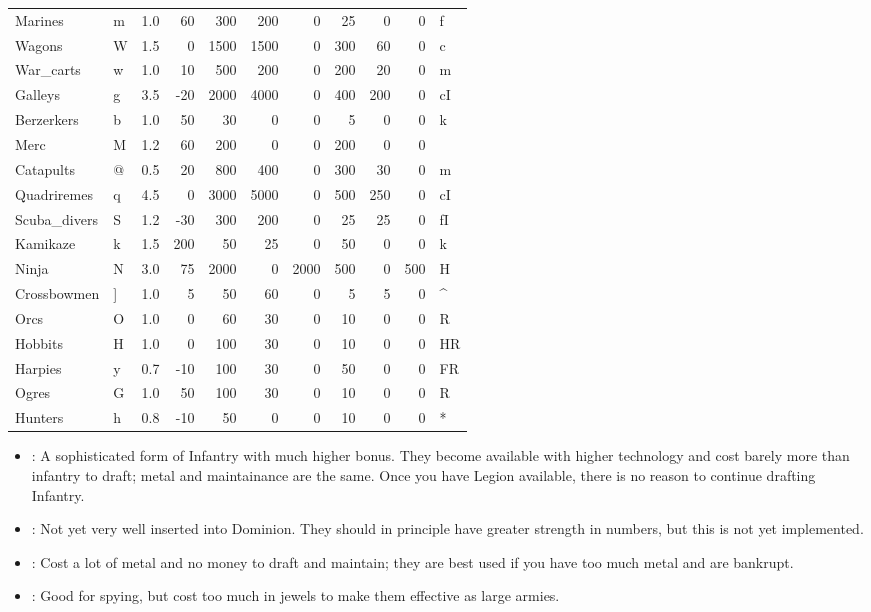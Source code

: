 \begin{same}
\begin{table}[hbpt]
\begin{tabular}{ || l | l | r | r | r | r | r | r | r | r | l || }
Marines      &m& 1.0&  60 & 300 & 200 &   0 &  25 &   0 &   0 &f\\
Wagons       &W& 1.5&   0 &1500 &1500 &   0 & 300 &  60 &   0 &c\\
War_carts    &w& 1.0&  10 & 500 & 200 &   0 & 200 &  20 &   0 &m\\
Galleys      &g& 3.5& -20 &2000 &4000 &   0 & 400 & 200 &   0 &cI\\
Berzerkers   &b& 1.0&  50 &  30 &   0 &   0 &   5 &   0 &   0 &k\\
Merc         &M& 1.2&  60 & 200 &   0 &   0 & 200 &   0 &   0 &\\
Catapults    &@& 0.5&  20 & 800 & 400 &   0 & 300 &  30 &   0 &m\\
Quadriremes  &q& 4.5&   0 &3000 &5000 &   0 & 500 & 250 &   0 &cI\\
Scuba_divers &S& 1.2& -30 & 300 & 200 &   0 &  25 &  25 &   0 &fI\\
Kamikaze     &k& 1.5& 200 &  50 &  25 &   0 &  50 &   0 &   0 &k\\
Ninja        &N& 3.0&  75 &2000 &   0 &2000 & 500 &   0 & 500 &H\\
Crossbowmen  &]& 1.0&   5 &  50 &  60 &   0 &   5 &   5 &   0 &^\\
Orcs         &O& 1.0&   0 &  60 &  30 &   0 &  10 &   0 &   0 &R\\
Hobbits      &H& 1.0&   0 & 100 &  30 &   0 &  10 &   0 &   0 &HR\\
Harpies      &y& 0.7& -10 & 100 &  30 &   0 &  50 &   0 &   0 &FR\\
Ogres        &G& 1.0&  50 & 100 &  30 &   0 &  10 &   0 &   0 &R\\
Hunters      &h& 0.8& -10 &  50 &   0 &   0 &  10 &   0 &   0 &*\\
\hline
\end{tabular}
\end{table}
\end{same}

\begin{itemize}
\item
{}: A sophisticated form of Infantry with much higher bonus.
They become available with higher technology and cost barely more than
infantry to draft; metal and maintainance are the same.  Once you have
Legion available, there is no reason to continue drafting Infantry.
\item
{}: Not yet very well inserted into Dominion.  They should in
principle have greater strength in numbers, but this is not yet
implemented.
\item
{}: Cost a lot of metal and no money to draft and maintain;
they are best used if you have too much metal and are bankrupt.
\item
{}: Good for spying, but cost too much in jewels to make
them effective as large armies.
\end{itemize}

